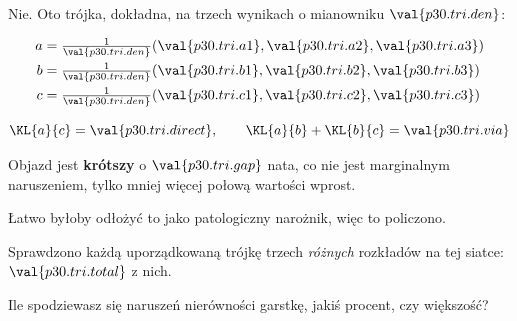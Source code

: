 \begin{fr}
\begin{ansblock}
Nie. Oto trójka, dokładna, na trzech wynikach o mianowniku
$\val{p30.tri.den}$:

\begin{align*}
  a &= \tfrac{1}{\val{p30.tri.den}}(\val{p30.tri.a1}, \val{p30.tri.a2},
       \val{p30.tri.a3}) \\
  b &= \tfrac{1}{\val{p30.tri.den}}(\val{p30.tri.b1}, \val{p30.tri.b2},
       \val{p30.tri.b3}) \\
  c &= \tfrac{1}{\val{p30.tri.den}}(\val{p30.tri.c1}, \val{p30.tri.c2},
       \val{p30.tri.c3})
\end{align*}

\[ \KL{a}{c} = \val{p30.tri.direct}, \qquad
   \KL{a}{b} + \KL{b}{c} = \val{p30.tri.via} \]

Objazd jest \textbf{krótszy} \dash{} o $\val{p30.tri.gap}$ nata, co nie jest
marginalnym naruszeniem, tylko mniej więcej połową wartości wprost.
\end{ansblock}
\end{fr}

\begin{fr}
Łatwo byłoby odłożyć to jako patologiczny narożnik, więc to policzono.

Sprawdzono każdą uporządkowaną trójkę trzech \emph{różnych} rozkładów na tej
siatce: $\val{p30.tri.total}$ z nich.

Ile spodziewasz się naruszeń nierówności \dash{} garstkę, jakiś procent, czy
większość?
\dotline
\nextframe
\end{fr}


